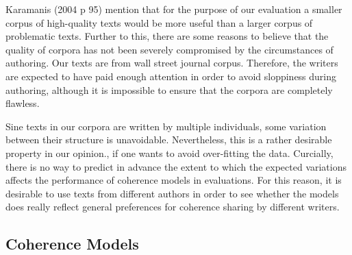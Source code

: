 Karamanis (2004 p 95) mention that for the purpose of our evaluation a smaller corpus of high-quality texts would be more useful than a larger corpus of problematic texts. 
Further to this, there are some reasons to believe that the quality of corpora has not been severely compromised by the circumstances of authoring. 
Our texts are from wall street journal corpus. 
Therefore, the writers are expected to have paid enough attention in order to avoid sloppiness during authoring, although it is impossible to ensure that the corpora are completely flawless. 

Sine texts in our corpora are written by multiple individuals, some variation between their structure is unavoidable. 
Nevertheless, this is a rather desirable property in our opinion., if one wants to avoid over-fitting the data. 
Curcially, there is no way to predict in advance the extent to which the expected variations affects the performance of coherence models in evaluations. 
For this reason, it is desirable to use texts from different authors in order to see whether the models does really reflect general preferences for coherence sharing by different writers. 


\subsection{Coherence Models}


